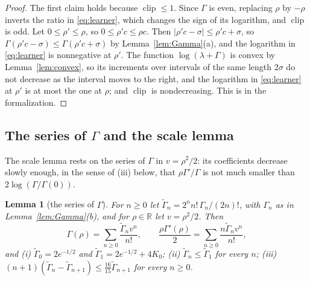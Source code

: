 \documentclass[12pt]{amsart}
\newtheorem{lemma}[theorem]{Lemma}
\theoremstyle{definition}
\numberwithin{equation}{section}
\newcommand{\R}{\mathbb{R}}
\newcommand{\clip}{\operatorname{clip}}
\newcommand{\leanmap}[1]{\ignorespaces}
\newcommand{\mapnote}[1]{\ignorespaces}
\begin{document}
\begin{proof}
The first claim holds because $\clip\le1$. Since $\Gamma$ is even, replacing $\rho$ by $-\rho$ inverts the ratio in \eqref{eq:learner}, which changes the sign of its logarithm, and $\clip$ is odd. Let $0\le\rho'\le\rho$, so $0\le\rho'c\le\rho c$. Then $|\rho'c-\sigma|\le\rho'c+\sigma$, so $\Gamma(\rho'c-\sigma)\le\Gamma(\rho'c+\sigma)$ by Lemma~\ref{lem:Gamma}(a), and the logarithm in \eqref{eq:learner} is nonnegative at $\rho'$. The function $\log(\lambda+\Gamma)$ is convex by Lemma~\ref{lem:convex}, so its increments over intervals of the same length $2\sigma$ do not decrease as the interval moves to the right, and the logarithm in \eqref{eq:learner} at $\rho'$ is at most the one at $\rho$; and $\clip$ is nondecreasing. This is  in the formalization.
\end{proof}

\subsection{The series of \texorpdfstring{$\Gamma$}{Gamma} and the scale lemma}
The scale lemma rests on the series of $\Gamma$ in $v=\rho^2/2$: its coefficients decrease slowly enough, in the sense of (iii) below, that $\rho\Gamma'/\Gamma$ is not much smaller than $2\log(\Gamma/\Gamma(0))$.

\begin{lemma}[the series of $\Gamma$]\label{lem:series}
\leanmap{RegretKappa.UnknownBT.UB.bco_beta, RegretKappa.UnknownBT.UB.G_hasSum_b,
  RegretKappa.UnknownBT.UB.rG1_hasSum_b, RegretKappa.UnknownBT.UB.bco_zero, RegretKappa.UnknownBT.UB.bco_one,
  RegretKappa.UnknownBT.UB.bco_le_one, RegretKappa.UnknownBT.UB.bco_succ_le, RegretKappa.UnknownBT.UB.kk_ratio_beta,
  RegretKappa.UnknownBT.UB.kk_ratio_mono}
\mapnote{Lean proves it in the normalization $\Gamma/2$, with the coefficients $\tilde\Gamma_n/2$ (\lname{RegretKappa.UnknownBT.UB.bco}).}
For $n\ge0$ let $\tilde\Gamma_n=2^nn!\,\Gamma_n/(2n)!$, with $\Gamma_n$ as in Lemma~\ref{lem:Gamma}(b), and for $\rho\in\R$ let $v=\rho^2/2$. Then
\[
\Gamma(\rho)=\sum_{n\ge0}\frac{\tilde\Gamma_nv^n}{n!},\qquad\frac{\rho\Gamma'(\rho)}2=\sum_{n\ge0}\frac{n\tilde\Gamma_nv^n}{n!},
\]
and (i) $\tilde\Gamma_0=2e^{-1/2}$ and $\tilde\Gamma_1=2e^{-1/2}+4K_0$; (ii) $\tilde\Gamma_n\le\tilde\Gamma_1$ for every $n$; (iii) $(n+1)(\tilde\Gamma_n-\tilde\Gamma_{n+1})\le\frac{16}{15}\tilde\Gamma_{n+1}$ for every $n\ge0$.
\end{lemma}
\end{document}
